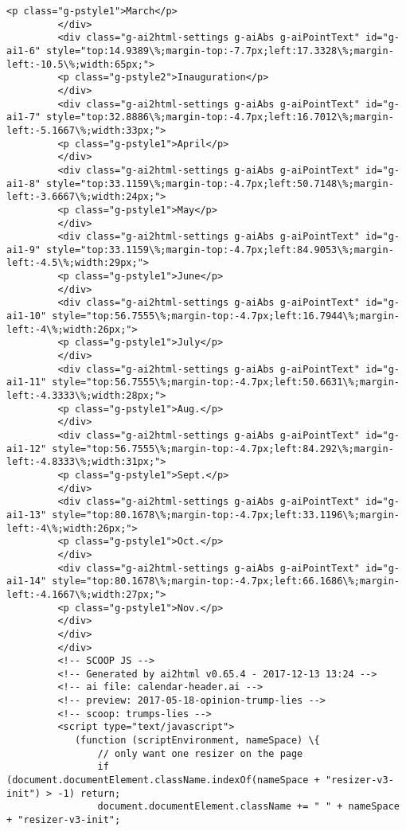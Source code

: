 \documentclass[11pt]{article}
\begin{document}
\begin{Verbatim}[commandchars=\\\{\}]
         <p class="g-pstyle1">March</p>
         </div>
         <div class="g-ai2html-settings g-aiAbs g-aiPointText" id="g-ai1-6" style="top:14.9389\%;margin-top:-7.7px;left:17.3328\%;margin-left:-10.5\%;width:65px;">
         <p class="g-pstyle2">Inauguration</p>
         </div>
         <div class="g-ai2html-settings g-aiAbs g-aiPointText" id="g-ai1-7" style="top:32.8886\%;margin-top:-4.7px;left:16.7012\%;margin-left:-5.1667\%;width:33px;">
         <p class="g-pstyle1">April</p>
         </div>
         <div class="g-ai2html-settings g-aiAbs g-aiPointText" id="g-ai1-8" style="top:33.1159\%;margin-top:-4.7px;left:50.7148\%;margin-left:-3.6667\%;width:24px;">
         <p class="g-pstyle1">May</p>
         </div>
         <div class="g-ai2html-settings g-aiAbs g-aiPointText" id="g-ai1-9" style="top:33.1159\%;margin-top:-4.7px;left:84.9053\%;margin-left:-4.5\%;width:29px;">
         <p class="g-pstyle1">June</p>
         </div>
         <div class="g-ai2html-settings g-aiAbs g-aiPointText" id="g-ai1-10" style="top:56.7555\%;margin-top:-4.7px;left:16.7944\%;margin-left:-4\%;width:26px;">
         <p class="g-pstyle1">July</p>
         </div>
         <div class="g-ai2html-settings g-aiAbs g-aiPointText" id="g-ai1-11" style="top:56.7555\%;margin-top:-4.7px;left:50.6631\%;margin-left:-4.3333\%;width:28px;">
         <p class="g-pstyle1">Aug.</p>
         </div>
         <div class="g-ai2html-settings g-aiAbs g-aiPointText" id="g-ai1-12" style="top:56.7555\%;margin-top:-4.7px;left:84.292\%;margin-left:-4.8333\%;width:31px;">
         <p class="g-pstyle1">Sept.</p>
         </div>
         <div class="g-ai2html-settings g-aiAbs g-aiPointText" id="g-ai1-13" style="top:80.1678\%;margin-top:-4.7px;left:33.1196\%;margin-left:-4\%;width:26px;">
         <p class="g-pstyle1">Oct.</p>
         </div>
         <div class="g-ai2html-settings g-aiAbs g-aiPointText" id="g-ai1-14" style="top:80.1678\%;margin-top:-4.7px;left:66.1686\%;margin-left:-4.1667\%;width:27px;">
         <p class="g-pstyle1">Nov.</p>
         </div>
         </div>
         </div>
         <!-- SCOOP JS -->
         <!-- Generated by ai2html v0.65.4 - 2017-12-13 13:24 -->
         <!-- ai file: calendar-header.ai -->
         <!-- preview: 2017-05-18-opinion-trump-lies -->
         <!-- scoop: trumps-lies -->
         <script type="text/javascript">
         	(function (scriptEnvironment, nameSpace) \{
         		// only want one resizer on the page
         		if (document.documentElement.className.indexOf(nameSpace + "resizer-v3-init") > -1) return;
         		document.documentElement.className += " " + nameSpace + "resizer-v3-init";

\end{Verbatim}
\end{document}
